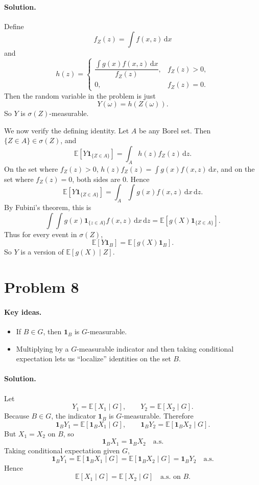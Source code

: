 \documentclass[11pt]{article}
\newcommand{\E}{\mathbb{E}}
\newcommand{\1}{\mathbf{1}}
\newcommand{\dd}{\,\mathrm{d}}
\begin{document}
\paragraph{Solution.}
Define
\[
    f_Z(z)=\int f(x,z)\dd x
\]
and
\[
    h(z)=
    \begin{cases}
        \dfrac{\int g(x)f(x,z)\dd x}{f_Z(z)}, & f_Z(z)>0,\\[1.2ex]
        0, & f_Z(z)=0.
    \end{cases}
\]
Then the random variable in the problem is just
\[
    Y(\omega)=h(Z(\omega)).
\]
So \(Y\) is \(\sigma(Z)\)-measurable.

We now verify the defining identity. Let \(A\) be any Borel set. Then \(\{Z\in A\}\in \sigma(Z)\), and
\[
    \E\!\left[Y\1_{\{Z\in A\}}\right]
    =
    \int_A h(z)f_Z(z)\dd z.
\]
On the set where \(f_Z(z)>0\), \(h(z)f_Z(z)=\int g(x)f(x,z)\dd x\), and on the set where \(f_Z(z)=0\), both sides are \(0\). Hence
\[
    \E\!\left[Y\1_{\{Z\in A\}}\right]
    =
    \int_A \int g(x)f(x,z)\dd x \dd z.
\]
By Fubini's theorem, this is
\[
    \int \int g(x)\1_{\{z\in A\}} f(x,z)\dd x \dd z
    =
    \E\!\left[g(X)\1_{\{Z\in A\}}\right].
\]
Thus for every event in \(\sigma(Z)\),
\[
    \E\!\left[Y\1_B\right]=\E\!\left[g(X)\1_B\right].
\]
So \(Y\) is a version of \(\E[g(X)\mid Z]\).

\section*{Problem 8}
\paragraph{Key ideas.}
\begin{itemize}
    \item If \(B\in G\), then \(\1_B\) is \(G\)-measurable.
    \item Multiplying by a \(G\)-measurable indicator and then taking conditional expectation lets us ``localize'' identities on the set \(B\).
\end{itemize}

\paragraph{Solution.}
Let
\[
    Y_1=\E[X_1\mid G],
    \qquad
    Y_2=\E[X_2\mid G].
\]
Because \(B\in G\), the indicator \(\1_B\) is \(G\)-measurable. Therefore
\[
    \1_B Y_1 = \E[\1_B X_1 \mid G],
    \qquad
    \1_B Y_2 = \E[\1_B X_2 \mid G].
\]
But \(X_1=X_2\) on \(B\), so
\[
    \1_B X_1 = \1_B X_2 \quad \text{a.s.}
\]
Taking conditional expectation given \(G\),
\[
    \1_B Y_1 = \E[\1_B X_1\mid G] = \E[\1_B X_2\mid G] = \1_B Y_2
    \quad \text{a.s.}
\]
Hence
\[
    \E[X_1\mid G] = \E[X_2\mid G]
    \quad \text{a.s. on } B.
\]
\end{document}
